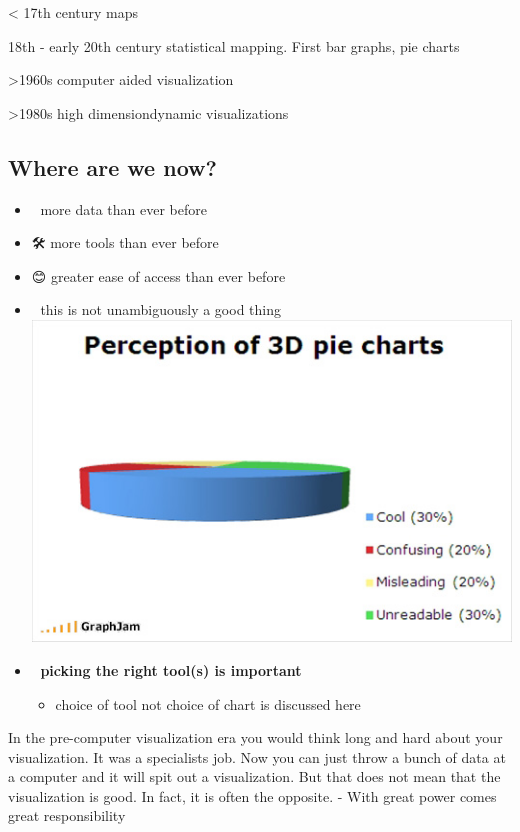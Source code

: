 \documentclass[
  letterpaper,
  DIV=11,
  numbers=noendperiod]{scrartcl}
\providecommand{\tightlist}{%
  \setlength{\itemsep}{0pt}\setlength{\parskip}{0pt}}\usepackage{longtable,booktabs,array}
\begin{document}
\textless{} 17th century maps

18th - early 20th century statistical mapping. First bar graphs, pie
charts

\textgreater1960s computer aided visualization

\textgreater1980s high dimensiondynamic visualizations

\hypertarget{where-are-we-now}{%
\subsection{Where are we now?}\label{where-are-we-now}}

\begin{itemize}
\tightlist
\item
  🚀 more data than ever before
\item
  🛠️ more tools than ever before
\item
  😊 greater ease of access than ever before
\item
  🤯 this is not unambiguously a good thing
  \includegraphics[width=10.41667in,height=\textheight]{images/perception_pie_charts.jpg}
\item
  🔧 \textbf{picking the right tool(s) is important}

  \begin{itemize}
  \tightlist
  \item
    choice of tool not choice of chart is discussed here
  \end{itemize}
\end{itemize}

In the pre-computer visualization era you would think long and hard
about your visualization. It was a specialists job. Now you can just
throw a bunch of data at a computer and it will spit out a
visualization. But that does not mean that the visualization is good. In
fact, it is often the opposite. - With great power comes great
responsibility
\end{document}
